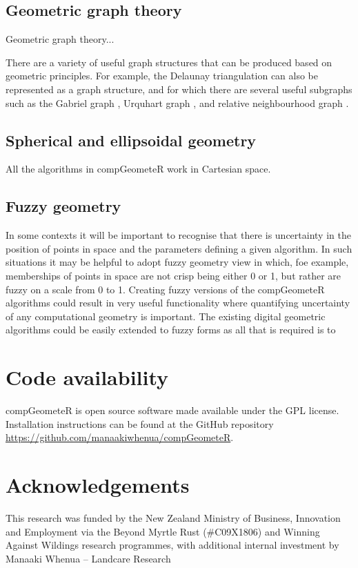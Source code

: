 \documentclass[12pt, a4paper]{article}
\begin{document}
\subsection{Geometric graph theory}

Geometric graph theory...

There are a variety of useful graph structures that can be produced based on geometric principles.  For example, the Delaunay triangulation \citep{delaunay-1934} can also be represented as a graph structure, and for which there are several useful subgraphs such as the Gabriel graph \citep{gabriel-1969}, Urquhart graph \citep{urquhart-1980}, and relative neighbourhood graph \citep{toussaint-1980}.



\subsection{Spherical and ellipsoidal geometry}

All the algorithms in compGeometeR work in Cartesian space.

\subsection{Fuzzy geometry}

In some contexts it will be important to recognise that there is uncertainty in the position of points in space and the parameters defining a given algorithm.  In such situations it may be helpful to adopt fuzzy geometry \citep{rosenfeld-1998} view in which, foe example, memberships of points in space are not crisp being either 0 or 1, but rather are fuzzy on a scale from 0 to 1.  Creating fuzzy versions of the compGeometeR algorithms could result in very useful functionality where quantifying uncertainty of any computational geometry is important.  The existing digital geometric algorithms could be easily extended to fuzzy forms as all that is required is to 




\section{Code availability}

compGeometeR is open source software made available under the GPL license. Installation
instructions can be found at the GitHub repository \url{https://github.com/manaakiwhenua/compGeometeR}.

\section{Acknowledgements}

This research was funded by the New Zealand Ministry of Business, Innovation and Employment via the Beyond Myrtle Rust (\#C09X1806) and Winning Against Wildings research programmes, with additional internal investment by Manaaki Whenua -- Landcare Research



\end{document}
